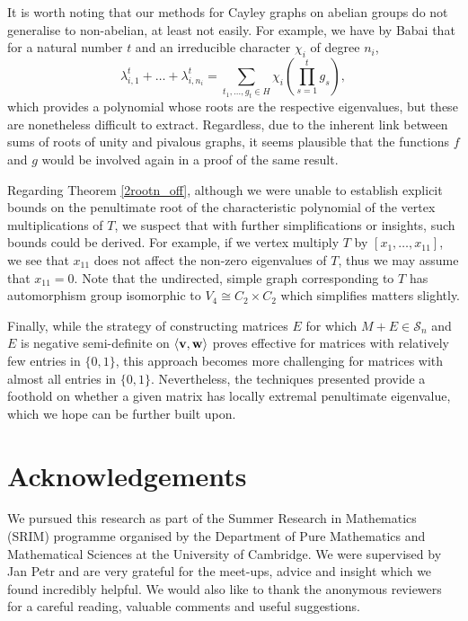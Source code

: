 \documentclass[12pt]{article}
\begin{document}
It is worth noting that our methods for Cayley graphs on abelian groups do not generalise to non-abelian, at least not easily. For example, we have by Babai \cite{BabaiCayleySpectra} that for a natural number $t$ and an irreducible character $\chi_i$ of degree $n_i$,
\[\lambda_{i,1}^t + \dots + \lambda_{i,n_i}^t = \sum_{t_1, \dots, g_t \in H} \chi_i\left(\prod_{s=1}^t g_s\right),\]
which provides a polynomial whose roots are the respective eigenvalues, but these are nonetheless difficult to extract. Regardless, due to the inherent link between sums of roots of unity and pivalous graphs, it seems plausible that the functions $f$ and $g$ would be involved again in a proof of the same result. 

Regarding Theorem \ref{2rootn_off}, although we were unable to establish explicit bounds on the penultimate root of the characteristic polynomial of the vertex multiplications of $T$, we suspect that with further simplifications or insights, such bounds could be derived. For example, if we vertex multiply $T$ by $[x_1,\dots, x_{11}]$, we see that $x_{11}$ does not affect the non-zero eigenvalues of $T$, thus we may assume that $x_{11}=0$. Note that the undirected, simple graph corresponding to $T$ has automorphism group isomorphic to $V_{4}\cong C_2\times C_2$ which simplifies matters slightly. 

Finally, while the strategy of constructing matrices $E$ for which $M+E\in \mathcal{S}_n$ and $E$ is negative semi-definite on $\braket{\bold{v,w}}$ proves effective for matrices with relatively few entries in $\{0,1\}$, this approach becomes more challenging for matrices with almost all entries in $\{0,1\}$. Nevertheless, the techniques presented provide a foothold on whether a given matrix has locally extremal penultimate eigenvalue, which we hope can be further built upon.

\section{Acknowledgements}

We pursued this research as part of the Summer Research in Mathematics (SRIM) programme organised by the Department of Pure Mathematics and Mathematical Sciences at the University of Cambridge. We were supervised by Jan Petr and are very grateful for the meet-ups, advice and insight which we found incredibly helpful. We would also like to thank the anonymous reviewers for a careful reading, valuable comments and useful suggestions.
\end{document}
